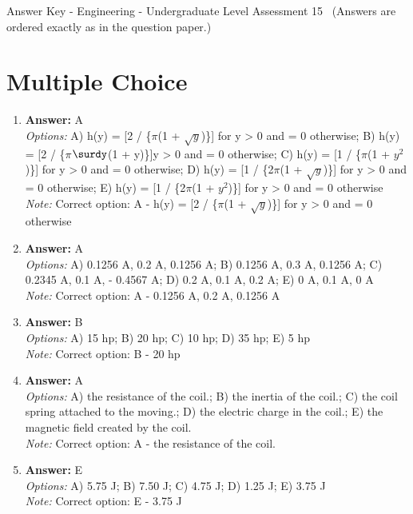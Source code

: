 \documentclass[12pt]{article}
\begin{document}
\begin{center}
Answer Key - Engineering - Undergraduate Level Assessment 15 \
\small (Answers are ordered exactly as in the question paper.)
\end{center}

\section*{Multiple Choice}
\begin{enumerate}[label=\arabic*.]
\item \textbf{Answer:} A
\\ \textit{Options:} A) h(y) = [2 / \{\ensuremath{\pi}(1 + \ensuremath{\sqrt{y}})\}] for y \textgreater{} 0 and = 0 otherwise; B) h(y) = [2 / \{\ensuremath{\pi}\ensuremath{\surdy}(1 + y)\}]y \textgreater{} 0 and = 0 otherwise; C) h(y) = [1 / \{\ensuremath{\pi}(1 + $y^2$)\}] for y \textgreater{} 0 and = 0 otherwise; D) h(y) = [1 / \{2\ensuremath{\pi}(1 + \ensuremath{\sqrt{y}})\}] for y \textgreater{} 0 and = 0 otherwise; E) h(y) = [1 / \{2\ensuremath{\pi}(1 + $y^2$)\}] for y \textgreater{} 0 and = 0 otherwise
\\ \textit{Note:} Correct option: A - h(y) = [2 / \{\ensuremath{\pi}(1 + \ensuremath{\sqrt{y}})\}] for y \textgreater{} 0 and = 0 otherwise
\item \textbf{Answer:} A
\\ \textit{Options:} A) 0.1256 A, 0.2 A, 0.1256 A; B) 0.1256 A, 0.3 A, 0.1256 A; C) 0.2345 A, 0.1 A, - 0.4567 A; D) 0.2 A, 0.1 A, 0.2 A; E) 0 A, 0.1 A, 0 A
\\ \textit{Note:} Correct option: A - 0.1256 A, 0.2 A, 0.1256 A
\item \textbf{Answer:} B
\\ \textit{Options:} A) 15 hp; B) 20 hp; C) 10 hp; D) 35 hp; E) 5 hp
\\ \textit{Note:} Correct option: B - 20 hp
\item \textbf{Answer:} A
\\ \textit{Options:} A) the resistance of the coil.; B) the inertia of the coil.; C) the coil spring attached to the moving.; D) the electric charge in the coil.; E) the magnetic field created by the coil.
\\ \textit{Note:} Correct option: A - the resistance of the coil.
\item \textbf{Answer:} E
\\ \textit{Options:} A) 5.75 J; B) 7.50 J; C) 4.75 J; D) 1.25 J; E) 3.75 J
\\ \textit{Note:} Correct option: E - 3.75 J
\end{enumerate}
\end{document}
